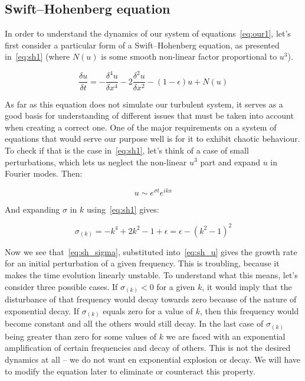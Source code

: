 \documentclass[11pt,a4paper]{article}
\begin{document}
\subsection{Swift--Hohenberg equation}
In order to understand the dynamics of our system of equations~\eqref{eq:our1}, let's first consider a particular form of a Swift--Hohenberg\cite{Hohenberg74} equation, as presented in~\eqref{eq:sh1} (where $N(u)$ is some smooth non-linear factor proportional to $u^3$).

\begin{equation}\label{eq:sh1}
\frac{\delta u}{\delta t} = -\frac{\delta^4u}{\delta x^4} - 2\frac{\delta^2u}{\delta x^2} - (1 - \epsilon )u + N(u)
\end{equation}

As far as this equation does not simulate our turbulent system, it serves as a good basis for understanding of different issues that must be taken into account when creating a correct one.
One of the major requirements on a system of equations that would serve our purpose well is for it to exhibit chaotic behaviour.
To check if that is the case in~\eqref{eq:sh1}, let's think of a case of small perturbations, which lets us neglect the non-linear $u^3$ part and expand $u$ in Fourier modes. Then:

\begin{equation}\label{eq:sh_u}
    u \sim e^{\sigma t}e^{ikx}
\end{equation}

And expanding $\sigma$ in $k$ using~\eqref{eq:sh1} gives:

\begin{equation}\label{eq:sh_sigma}
    \sigma_{(k)} = -k^4 + 2k^2 - 1 + \epsilon = \epsilon - (k^2 - 1)^2
\end{equation}

Now we see that~\eqref{eq:sh_sigma}, substituted into~\eqref{eq:sh_u} gives the growth rate for an initial perturbation of a given frequency.
This is troubling, because it makes the time evolution linearly unstable.
To understand what this means, let's consider three possible cases.
If $\sigma_{(k)} < 0$ for a given $k$, it would imply that the disturbance of that frequency would decay towards zero because of the nature of exponential decay.
If $\sigma_{(k)}$ equals zero for a value of $k$, then this frequency would become constant and all the others would still decay.
In the last case of $\sigma_{(k)}$ being greater than zero for some values of $k$ we are faced with an exponential amplification of certain frequencies and decay of others.
This is not the desired dynamics at all -- we do not want en exponential explosion or decay.
We will have to modify the equation later to eliminate or counteract this property.
\end{document}
